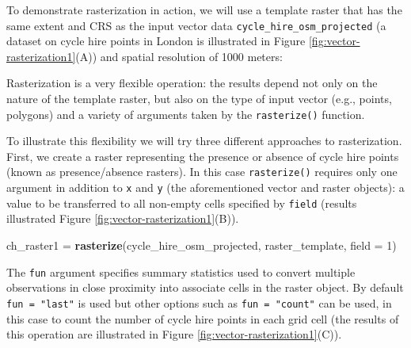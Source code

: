 \documentclass[]{krantz}
\newenvironment{Shaded}{\begin{snugshade}}{\end{snugshade}}
\newcommand{\DataTypeTok}[1]{\textcolor[rgb]{0.27,0.27,0.27}{#1}}
\newcommand{\DecValTok}[1]{\textcolor[rgb]{0.06,0.06,0.06}{#1}}
\newcommand{\KeywordTok}[1]{\textcolor[rgb]{0.27,0.27,0.27}{\textbf{#1}}}
\newcommand{\NormalTok}[1]{#1}
\newcommand{\OperatorTok}[1]{\textcolor[rgb]{0.43,0.43,0.43}{\textbf{#1}}}
\newcommand{\StringTok}[1]{\textcolor[rgb]{0.5,0.5,0.5}{#1}}
\begin{document}
To demonstrate rasterization in action, we will use a template raster that has the same extent and CRS as the input vector data \texttt{cycle\_hire\_osm\_projected} (a dataset on cycle hire points in London is illustrated in Figure \ref{fig:vector-rasterization1}(A)) and spatial resolution of 1000 meters:

\begin{Shaded}
\end{Shaded}

Rasterization is a very flexible operation: the results depend not only on the nature of the template raster, but also on the type of input vector (e.g., points, polygons) and a variety of arguments taken by the \texttt{rasterize()} function.

To illustrate this flexibility we will try three different approaches to rasterization.
First, we create a raster representing the presence or absence of cycle hire points (known as presence/absence rasters).
In this case \texttt{rasterize()} requires only one argument in addition to \texttt{x} and \texttt{y} (the aforementioned vector and raster objects): a value to be transferred to all non-empty cells specified by \texttt{field} (results illustrated Figure \ref{fig:vector-rasterization1}(B)).

\begin{Shaded}
\begin{Highlighting}[]
\NormalTok{ch_raster1 =}\StringTok{ }\KeywordTok{rasterize}\NormalTok{(cycle_hire_osm_projected, raster_template, }\DataTypeTok{field =} \DecValTok{1}\NormalTok{)}
\end{Highlighting}
\end{Shaded}

The \texttt{fun} argument specifies summary statistics used to convert multiple observations in close proximity into associate cells in the raster object.
By default \texttt{fun\ =\ "last"} is used but other options such as \texttt{fun\ =\ "count"} can be used, in this case to count the number of cycle hire points in each grid cell (the results of this operation are illustrated in Figure \ref{fig:vector-rasterization1}(C)).
\end{document}
